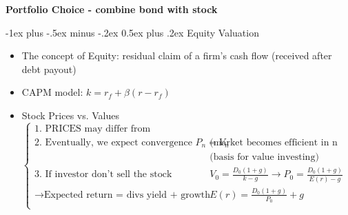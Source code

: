 \documentclass[10pt,landscape]{article}
\makeatletter
\renewcommand{\section}{\@startsection{section}{1}{0mm}%
                                {-1ex plus -.5ex minus -.2ex}%
                                {0.5ex plus .2ex}%
                                {\normalfont\large\bfseries}}
\makeatother
\begin{document}
\newpage
    \begin{center}
         \Large{\textbf{Portfolio Choice - combine bond with stock}} \\
    \end{center}

    \begin{multicols}{2}
	\setlength{\premulticols}{1pt}
	\setlength{\postmulticols}{1pt}
	\setlength{\multicolsep}{1pt}
	\setlength{\columnsep}{2pt}

    \section{Equity Valuation}
    \begin{itemize}
        \item The concept of {\color{red}Equity}: residual claim of a firm's cash flow (received after debt payout)
        \item CAPM model: $k = r_f +\beta(r-r_f)$ 
        \item Stock Prices vs. Values \\
        	$
            \begin{cases}
                \text{1. PRICES may differ from fundamental VALUES}\\
                \text{2. Eventually, we expect convergence $P_n = V_n$}& \text{(market becomes efficient in n years)}\\
                \text{}& \text{(basis for value investing)}\\
                \text{3. If investor don't sell the stock} & \displaystyle V_0=\frac{D_0(1+g)}{k-g} \rightarrow \displaystyle P_0=\frac{D_0(1+g)}{E(r)-g}\\
                \rightarrow \text{Expected return = divs yield + growth in divs} & \displaystyle E(r)=\frac{D_0(1+g)}{P_0}+g\\
            \end{cases}
            $

    \end{itemize}


\end{multicols}
\end{document}
